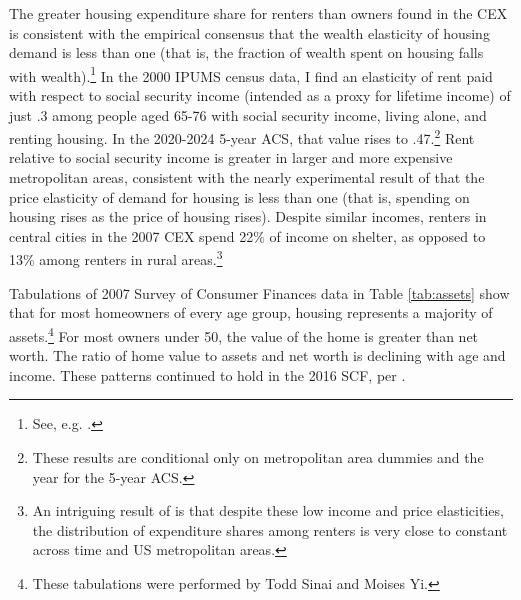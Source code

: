 \documentclass[12pt]{article}
\begin{document}
The greater housing expenditure share for renters than owners found in the CEX is
consistent with the empirical consensus that the wealth elasticity of housing
demand is less than one (that is, the fraction of wealth spent on housing falls
with wealth).\footnote{See, e.g. \textcite{Carliner}.}  In the 2000 IPUMS census
data, I find an elasticity of rent paid with respect to social security income
(intended as a proxy for lifetime income) of just .3 among people aged 65-76 with social security income, living
alone, and renting housing.  In the 2020-2024 5-year ACS, that value rises to
.47.\footnote{These results are conditional only on metropolitan area dummies
and the year for the 5-year ACS.} Rent relative to social security income is
greater in larger and more expensive metropolitan areas, consistent with the
nearly experimental result of \textcite{HanushekQuigley} that the price
elasticity of demand for housing is less than one (that is, spending on housing
rises as the price of housing rises). Despite similar incomes, renters in
central cities in the 2007 CEX spend 22\% of income on shelter, as opposed to
13\% among renters in rural areas.\footnote{An intriguing result of
	\textcite{DavisFOM} is that despite these low income and price
elasticities, the distribution of expenditure shares among renters is very
close to constant across time and US metropolitan areas.}

Tabulations of 2007 Survey of Consumer Finances data in Table \ref{tab:assets}
show that for most homeowners of every age group, housing represents a majority
of assets.\footnote{These tabulations were performed by
Todd Sinai and Moises Yi.} For most owners under 50, the value of the home is
greater than net worth. The ratio of home value to assets and net worth is
declining with age and income. These patterns continued to hold in the 2016
SCF, per \textcite{nahb2018homeownership}.
\end{document}
